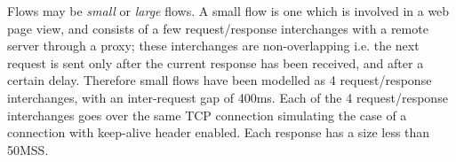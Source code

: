 \documentclass[conference]{../../IEEEtran}
\begin{document}
\begin{comment}	
\begin{table}[ht]
\caption{Inter-session time distribution - mixture of exponentials}
\centering
\resizebox{5cm}{!}{
\begin{tabular}{|c|c|}
\hline
 Mixture Weight & Mean(s) \\
\hline
0.37&1.8\\
0.47&12\\
0.16&100\\
\hline
\end{tabular}
}
\label{tab:mixdet}
\end{table}

\begin{table}[ht]
\caption{\emph{CDF} for observed and assumed response size distributions}
\centering
\resizebox{7cm}{!}{
\begin{tabular}{|c|c|c|}
\hline
 $x$ & Observed CDF & Assumed CDF \\
 & $F(\cdot)$ & $F'(\cdot)$\\
\hline
\hline
1000&0.30&0.30\\
\hline
10000&0.87&0.81\\
\hline
100000&0.986&0.989\\
\hline
1000000&0.998&0.9998\\
\hline
\end{tabular}
}
\label{tab:respszcdf}
\end{table}
\end{comment}

Flows may be \emph{small} or \emph{large} flows. A small flow is one which is involved in a web page view, and consists of a few request/response interchanges with a remote server through a proxy; these interchanges are non-overlapping i.e. the next request is sent only after the current response has been received, and after a certain delay. Therefore small flows have been modelled as 4 request/response interchanges, with an inter-request gap of 400ms. Each of the 4 request/response interchanges goes over the same TCP connection simulating the case of a connection with keep-alive header enabled. Each response has a size less than 50MSS.
\end{document}
